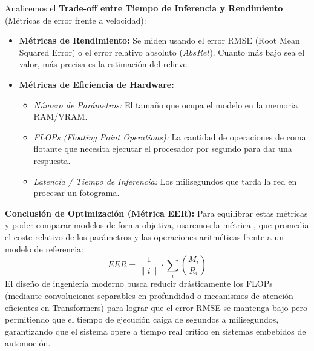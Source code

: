 \noindent
Analicemos el \textbf{Trade-off entre Tiempo de Inferencia y Rendimiento} (Métricas de error frente a velocidad):

\begin{itemize}
    \item \textbf{Métricas de Rendimiento:} Se miden usando el error RMSE (Root Mean Squared Error) o el error relativo absoluto ($AbsRel$). Cuanto más bajo sea el valor, más precisa es la estimación del relieve.
    \item \textbf{Métricas de Eficiencia de Hardware:}
    \begin{itemize}
        \item \textit{Número de Parámetros:} El tamaño que ocupa el modelo en la memoria RAM/VRAM.
        \item \textit{FLOPs (Floating Point Operations):} La cantidad de operaciones de coma flotante que necesita ejecutar el procesador por segundo para dar una respuesta.
        \item \textit{Latencia / Tiempo de Inferencia:} Los milisegundos que tarda la red en procesar un fotograma.
    \end{itemize}
\end{itemize}
\textbf{Conclusión de Optimización (Métrica EER):}
Para equilibrar estas métricas y poder comparar modelos de forma objetiva, usaremos la métrica , que promedia el coste relativo de los parámetros y las operaciones aritméticas frente a un modelo de referencia:
\begin{equation}
    EER = \frac{1}{\|i\|} \cdot \sum_{i} \left( \frac{M_i}{R_i} \right)
\end{equation}
El diseño de ingeniería moderno busca reducir drásticamente los FLOPs (mediante convoluciones separables en profundidad o mecanismos de atención eficientes en Transformers) para lograr que el error RMSE se mantenga bajo pero permitiendo que el tiempo de ejecución caiga de segundos a milisegundos, garantizando que el sistema opere a tiempo real crítico en sistemas embebidos de automoción.

